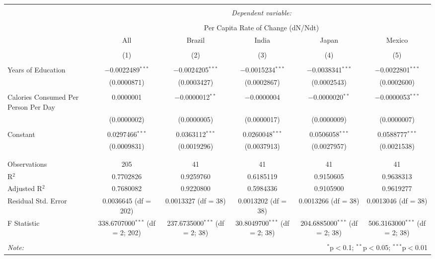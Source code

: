 \documentclass[]{article}
\begin{document}
\begin{tabular}{@{\extracolsep{5pt}}lccccc}  \\[-1.8ex]\hline  \hline \\[-1.8ex]   & \multicolumn{5}{c}{\textit{Dependent variable:}} \\  \cline{2-6}  \\[-1.8ex] & \multicolumn{5}{c}{Per Capita Rate of Change (dN/Ndt)} \\   & All & Brazil & India & Japan & Mexico \\  \\[-1.8ex] & (1) & (2) & (3) & (4) & (5)\\  \hline \\[-1.8ex]   Years of Education & $-$0.0022489$^{***}$ & $-$0.0024205$^{***}$ & $-$0.0015234$^{***}$ & $-$0.0038341$^{***}$ & $-$0.0022801$^{***}$ \\    & (0.0000871) & (0.0003427) & (0.0002867) & (0.0002543) & (0.0002600) \\    & & & & & \\   Calories Consumed Per Person Per Day & 0.0000001 & $-$0.0000012$^{**}$ & $-$0.0000004 & $-$0.0000020$^{**}$ & $-$0.0000053$^{***}$ \\    & (0.0000002) & (0.0000005) & (0.0000017) & (0.0000009) & (0.0000007) \\    & & & & & \\   Constant & 0.0297466$^{***}$ & 0.0363112$^{***}$ & 0.0260048$^{***}$ & 0.0506058$^{***}$ & 0.0588777$^{***}$ \\    & (0.0009831) & (0.0019296) & (0.0037913) & (0.0027957) & (0.0021538) \\    & & & & & \\  \hline \\[-1.8ex]  Observations & 205 & 41 & 41 & 41 & 41 \\  R$^{2}$ & 0.7702826 & 0.9259760 & 0.6185119 & 0.9150605 & 0.9638313 \\  Adjusted R$^{2}$ & 0.7680082 & 0.9220800 & 0.5984336 & 0.9105900 & 0.9619277 \\  Residual Std. Error & 0.0036645 (df = 202) & 0.0013327 (df = 38) & 0.0013202 (df = 38) & 0.0013266 (df = 38) & 0.0013046 (df = 38) \\  F Statistic & 338.6707000$^{***}$ (df = 2; 202) & 237.6735000$^{***}$ (df = 2; 38) & 30.8049700$^{***}$ (df = 2; 38) & 204.6885000$^{***}$ (df = 2; 38) & 506.3163000$^{***}$ (df = 2; 38) \\  \hline  \hline \\[-1.8ex]  \textit{Note:}  & \multicolumn{5}{r}{$^{*}$p$<$0.1; $^{**}$p$<$0.05; $^{***}$p$<$0.01} \\  \end{tabular}
\end{document}
